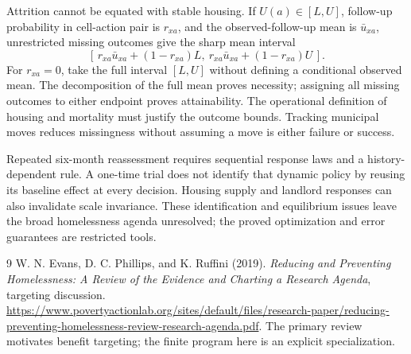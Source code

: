 \documentclass[11pt,a4paper]{article}
\begin{document}
Attrition cannot be equated with stable housing. If $U(a)\in[L,U]$, follow-up probability in cell-action pair is $r_{xa}$, and the observed-follow-up mean is $\bar u_{xa}$, unrestricted missing outcomes give the sharp mean interval
\[
 [\,r_{xa}\bar u_{xa}+(1-r_{xa})L,\
    r_{xa}\bar u_{xa}+(1-r_{xa})U\,].
\]
For $r_{xa}=0$, take the full interval $[L,U]$ without defining a conditional observed mean. The decomposition of the full mean proves necessity; assigning all missing outcomes to either endpoint proves attainability. The operational definition of housing and mortality must justify the outcome bounds. Tracking municipal moves reduces missingness without assuming a move is either failure or success.

Repeated six-month reassessment requires sequential response laws and a history-dependent rule. A one-time trial does not identify that dynamic policy by reusing its baseline effect at every decision. Housing supply and landlord responses can also invalidate scale invariance. These identification and equilibrium issues leave the broad homelessness agenda unresolved; the proved optimization and error guarantees are restricted tools.
\begin{thebibliography}{9}
 W. N. Evans, D. C. Phillips, and K. Ruffini (2019).
\emph{Reducing and Preventing Homelessness: A Review of the Evidence and Charting a Research Agenda}, targeting discussion.
\url{https://www.povertyactionlab.org/sites/default/files/research-paper/reducing-preventing-homelessness-review-research-agenda.pdf}.
The primary review motivates benefit targeting; the finite program here is an explicit specialization.
\end{thebibliography}
\end{document}
